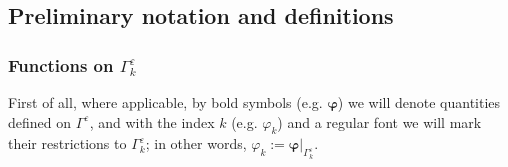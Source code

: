 \documentclass[]{article}
\numberwithin{equation}{section}
\numberwithin{theorem}{section}
\numberwithin{lemma}{section}
\numberwithin{corollary}{section}
\numberwithin{proposition}{section}
\numberwithin{definition}{section}
\newcommand{\re}{\varepsilon}
\begin{document}
	\subsection{Preliminary notation and definitions}
	
	\subsubsection{Functions on $\Gamma^{\re}_k$} First of all, where applicable, by bold symbols (e.g. $\boldsymbol{\varphi}$) we will denote quantities defined on $\Gamma^{\re}$, and with the index $k$ (e.g. $\varphi_k$) and a regular font we will mark their restrictions to $\Gamma_k^{\re}$; in other words, $\varphi_k:=\left.\boldsymbol{\varphi}\right|_{\Gamma_k^{\re}}$. 
	
\end{document}
